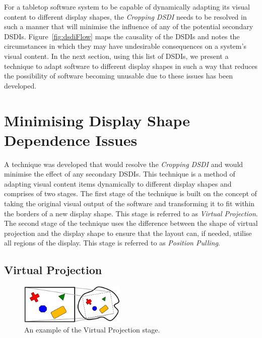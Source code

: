 \documentclass[review,5p,times,twocolumn]{elsarticle}
\begin{document}
For a tabletop software system to be capable of dynamically adapting its visual content to different display shapes, the {\emph{Cropping \ac{DSDI}}} needs to be resolved in such a manner that will minimise the influence of any of the potential secondary \acp{DSDI}.
Figure~\ref{fig:dsdiFlow} maps the causality of the \acp{DSDI} and notes the circumstances in which they may have undesirable consequences on a system's visual content.
In the next section, using this list of \acp{DSDI}, we present a technique to adapt software to different display shapes in such a way that reduces the possibility of software becoming unusable due to these issues has been developed.

\section{Minimising Display Shape Dependence Issues}
\label{sec:solution}

A technique was developed that would resolve the {\emph{Cropping \ac{DSDI}}} and would minimise the effect of any secondary \acp{DSDI}.
This technique is a method of adapting visual content items dynamically to different display shapes and comprises of two stages.
The first stage of the technique is built on the concept of taking the original visual output of the software and transforming it to fit within the borders of a new display shape.
This stage is referred to as {\em Virtual Projection}.
The second stage of the technique uses the difference between the shape of virtual projection and the display shape to ensure that the layout can, if needed, utilise all regions of the display.
This stage is referred to as {\em Position Pulling}.


\subsection{Virtual Projection}
\label{subsec:virtualprojection}

\begin{figure}[h]
 \centering
   \includegraphics[width=0.45\textwidth]{figures/virtual_rectangle.png}
   \caption{An example of the Virtual Projection stage.}
   \label{fig:virtualRectangle}
\end{figure}
\end{document}
